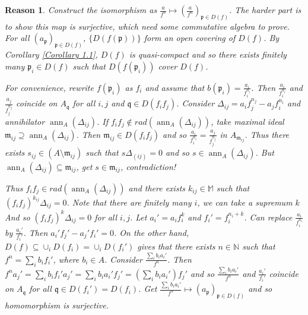 \documentclass{ctexart}
\newtheorem{reason}{Reason}[section]
\newcommand{\annihilator}{\operatorname{ann}}
\begin{document}
\begin{reason}
    Construct the isomorphism as $\frac{a}{f^{n}} \longmapsto (\frac{a}{f^{n}})_{\mathfrak{p}\in D(f)}$.
    The harder part is to show this map is surjective, which need some commutative algebra to prove.
    For all $(a_{\mathfrak{p}})_{\mathfrak{p}\in D(f)}$, $\{D(f(\mathfrak{p}))\}$ form an open covering of $D(f)$.
    By Corollary \ref{Corollary 1.1}, $D(f)$ is quasi-compact and so there exists finitely many $\mathfrak{p}_{i}\in D(f)$ such that $D(f(\mathfrak{p}_{i}))$ cover $D(f)$.
    \par
    For convenience, rewrite $f(\mathfrak{p}_{i})$ as $f_{i}$ and assume that $b(\mathfrak{p}_{i}) = \frac{a_{i}}{f_{i}^{n_{i}}}$.
    Then $\frac{a_{i}}{f_{i}^{n_{i}}}$ and $\frac{a_{j}}{f_{j}^{n_{j}}}$ coincide on $A_{\mathfrak{q}}$ for all $i,j$ and $\mathfrak{q}\in D(f_{i}f_{j})$.
    Consider $\Delta_{ij} = a_{i}f_{j}^{n_{j}} - a_{j}f_{i}^{n_{i}}$ and annihilator $\annihilator_{A}(\Delta_{ij})$.
    If $f_{i}f_{j}\notin rad(\annihilator_{A}(\Delta_{ij}))$, take maximal ideal $\mathfrak{m}_{ij} \supseteq \annihilator_{A}(\Delta_{ij})$.
    Then $\mathfrak{m}_{ij}\in D(f_{i}f_{j})$ and so $\frac{a_{i}}{f_{i}^{n_{i}}} = \frac{a_{j}}{f_{j}^{n_{j}}}$ in $A_{\mathfrak{m}_{ij}}$.
    Thus there exists $s_{ij}\in (A \setminus \mathfrak{m}_{ij})$ such that $s\Delta_(ij) = 0$ and so $s\in \annihilator_{A}(\Delta_{ij})$.
    But $\annihilator_{A}(\Delta_{ij}) \subseteq \mathfrak{m}_{ij}$, get $s\in \mathfrak{m}_{ij}$, contradiction!
    \par
    Thus $f_{i}f_{j}\in rad(\annihilator_{A}(\Delta_{ij}))$ and there exists $k_{ij}\in \mathbb{M}$ such that $(f_{i}f_{j})^{k_{ij}}\Delta_{ij} = 0$.
    Note that there are finitely many $i$, we can take a supremum $k$ And so $(f_{i}f_{j})^{k}\Delta_{ij} = 0$ for all $i,j$.
    Let $a_{i}' = a_{i}f_{i}^{k}$ and $f_{i}' = f_{i}^{n_{i} + k}$.
    Can replace $\frac{a_{i}}{f_{i}^{n_{i}}}$ by $\frac{a_{i}'}{f_{i}'}$.
    Then $a_{i}'f_{j}' - a_{j}'f_{i}' = 0$.
    On the other hand, $D(f) \subseteq \cup_{i} D(f_{i}) = \cup_{i}D(f_{i}')$ gives that there exists $n\in \mathbb{N}$ such that $f^{n} = \sum_{i} b_{i}f_{i}'$, where $b_{i}\in A$.
    Consider $\frac{\sum_{i} b_{i}a_{i}'}{f^{n}}$.
    Then $f^{n}a_{j}' = \sum_{i} b_{i}f_{i}'a_{j}' = \sum_{i} b_{i}a_{i}'f_{j}' = (\sum_{i} b_{i}a_{i}')f_{j}'$ and so $\frac{\sum_{i} b_{i}a_{i}'}{f^{n}}$ and $\frac{a_{i}'}{f_{i}'}$ coincide on $A_{\mathfrak{q}}$ for all $\mathfrak{q}\in D(f_{i}') = D(f_{i})$.
    Get $\frac{\sum_{i} b_{i}a_{i}'}{f^{n}} \longmapsto (a_{\mathfrak{p}})_{\mathfrak{p}\in D(f)}$ and so homomorphism is surjective.
\end{reason}
\end{document}
